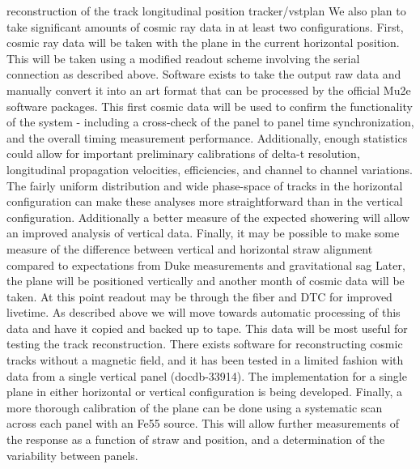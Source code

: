 reconstruction of the track longitudinal position
tracker/vstplan
We also plan to take significant amounts of cosmic ray data in at least two configurations. First, cosmic ray data will be taken with the plane in the current horizontal
position. This will be taken using a modified readout scheme involving the serial
connection as described above. Software exists to take the output raw data and manually convert it into an art format that can be processed by the official Mu2e software
packages. This first cosmic data will be used to confirm the functionality of the system - including a cross-check of the panel to panel time synchronization, and the
overall timing measurement performance. 
Additionally, enough statistics could allow
for important preliminary calibrations of delta-t resolution, longitudinal propagation
velocities, efficiencies, and channel to channel variations. The fairly uniform distribution and wide phase-space of tracks in the horizontal configuration can make these
analyses more straightforward than in the vertical configuration. Additionally a better measure of the expected showering will allow an improved analysis of vertical data.
Finally, it may be possible to make some measure of the difference between vertical
and horizontal straw alignment compared to expectations from Duke measurements
and gravitational sag
Later, the plane will be positioned vertically and another month of cosmic data
will be taken. At this point readout may be through the fiber and DTC for improved
livetime. As described above we will move towards automatic processing of this
data and have it copied and backed up to tape. This data will be most useful for
testing the track reconstruction. There exists software for reconstructing cosmic
tracks without a magnetic field, and it has been tested in a limited fashion with
data from a single vertical panel (docdb-33914). The implementation for a single
plane in either horizontal or vertical configuration is being developed.
Finally, a more thorough calibration of the plane can be done using a systematic
scan across each panel with an Fe55 source. This will allow further measurements of
the response as a function of straw and position, and a determination of the variability
between panels.